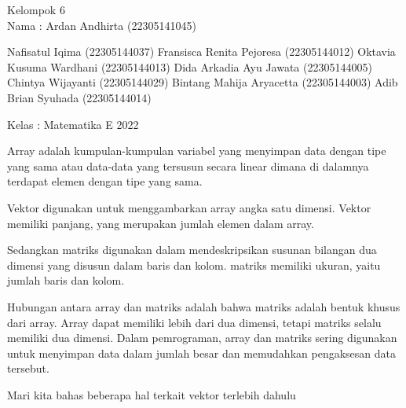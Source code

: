 \documentclass[a4paper,10pt]{article}
\begin{document}
\begin{eulernotebook}
\begin{eulercomment}
\begin{eulercomment}
\begin{eulercomment}
Kelompok 6\\
Nama  : Ardan Andhirta (22305141045)\\
\end{eulercomment}
\begin{eulerttcomment}
        Nafisatul Iqima (22305144037)
        Fransisca Renita Pejoresa (22305144012)
        Oktavia Kusuma Wardhani (22305144013)
        Dida Arkadia Ayu Jawata (22305144005)
        Chintya Wijayanti (22305144029)
        Bintang Mahija Aryacetta (22305144003)
        Adib Brian Syuhada (22305144014)
\end{eulerttcomment}
\begin{eulercomment}

Kelas : Matematika E 2022

\begin{eulercomment}
\begin{eulercomment}
\begin{eulercomment}
\begin{eulercomment}
Array adalah kumpulan-kumpulan variabel yang menyimpan data dengan
tipe yang sama atau data-data yang tersusun secara linear dimana di
dalamnya terdapat elemen dengan tipe yang sama.

Vektor digunakan untuk menggambarkan array angka satu dimensi. Vektor
memiliki panjang, yang merupakan jumlah elemen dalam array.

Sedangkan matriks digunakan dalam mendeskripsikan susunan bilangan dua\\
dimensi yang disusun dalam baris dan kolom. matriks memiliki ukuran,
yaitu jumlah baris dan kolom.

Hubungan antara array dan matriks adalah bahwa matriks adalah bentuk
khusus dari array. Array dapat memiliki lebih dari dua dimensi, tetapi
matriks selalu memiliki dua dimensi. Dalam pemrograman, array dan
matriks sering digunakan untuk menyimpan data dalam jumlah besar dan
memudahkan pengaksesan data tersebut.

Mari kita bahas beberapa hal terkait vektor terlebih dahulu


\end{eulercomment}
\end{eulercomment}
\end{eulercomment}
\end{eulercomment}
\end{eulercomment}
\end{eulercomment}
\end{eulercomment}
\end{eulernotebook}
\end{document}
